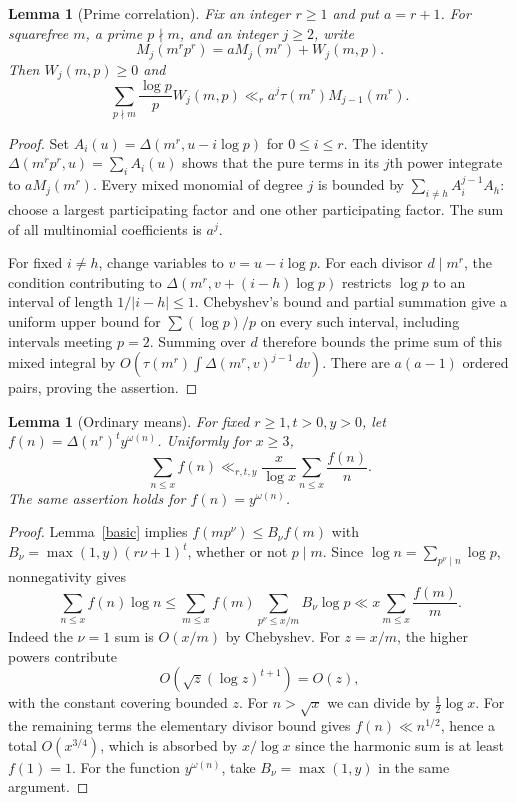 \documentclass[11pt,a4paper]{article}
\newtheorem{lemma}[theorem]{Lemma}
\newcommand{\Del}{\Delta}
\newcommand{\om}{\omega}
\begin{document}
\begin{lemma}[Prime correlation]\label{correlation}
Fix an integer $r\ge1$ and put $a=r+1$. For squarefree $m$, a prime
$p\nmid m$, and an integer $j\ge2$, write
\[
 M_j(m^rp^r)=aM_j(m^r)+W_j(m,p).
\]
Then $W_j(m,p)\ge0$ and
\[
 \sum_{p\nmid m}\frac{\log p}{p}W_j(m,p)
 \ll_r a^j\tau(m^r)M_{j-1}(m^r).
\]
\end{lemma}
\begin{proof}
Set $A_i(u)=\Del(m^r,u-i\log p)$ for $0\le i\le r$.
The identity $\Del(m^rp^r,u)=\sum_i A_i(u)$ shows that the pure
terms in its $j$th power integrate to $aM_j(m^r)$.
Every mixed monomial of degree $j$ is bounded by
$\sum_{i\ne h}A_i^{j-1}A_h$: choose a largest participating factor and
one other participating factor. The sum of all multinomial coefficients
is $a^j$.

For fixed $i\ne h$, change variables to $v=u-i\log p$.
For each divisor $d\mid m^r$, the condition contributing to
$\Del(m^r,v+(i-h)\log p)$ restricts $\log p$ to an interval of
length $1/|i-h|\le1$. Chebyshev's bound and partial summation give a
uniform upper bound for $\sum (\log p)/p$ on every such interval,
including intervals meeting $p=2$. Summing over $d$ therefore bounds
the prime sum of this mixed integral by
$O(\tau(m^r)\int\Del(m^r,v)^{j-1}\,dv)$.
There are $a(a-1)$ ordered pairs, proving the assertion.
\end{proof}

\begin{lemma}[Ordinary means]\label{means}
For fixed $r\ge1,t>0,y>0$, let
$f(n)=\Del(n^r)^t y^{\om(n)}$. Uniformly for $x\ge3$,
\[
 \sum_{n\le x}f(n)\ll_{r,t,y}
 \frac{x}{\log x}\sum_{n\le x}\frac{f(n)}n.
\]
The same assertion holds for $f(n)=y^{\om(n)}$.
\end{lemma}
\begin{proof}
Lemma~\ref{basic} implies
$f(mp^\nu)\le B_\nu f(m)$ with
$B_\nu=\max(1,y)(r\nu+1)^t$, whether or not $p\mid m$.
Since $\log n=\sum_{p^\nu\mid n}\log p$, nonnegativity gives
\[
 \sum_{n\le x}f(n)\log n
 \le\sum_{m\le x}f(m)
       \sum_{p^\nu\le x/m}B_\nu\log p
 \ll x\sum_{m\le x}\frac{f(m)}m.
\]
Indeed the $\nu=1$ sum is $O(x/m)$ by Chebyshev. For $z=x/m$, the
higher powers contribute
\[
 O(\sqrt z(\log z)^{t+1})=O(z),
\]
with the constant covering bounded $z$. For $n>\sqrt x$ we can divide by
$\tfrac12\log x$. For the remaining terms the elementary divisor
bound gives $f(n)\ll n^{1/2}$, hence a total $O(x^{3/4})$, which is
absorbed by $x/\log x$ since the harmonic sum is at least $f(1)=1$.
For the function $y^{\om(n)}$, take $B_\nu=\max(1,y)$ in the same argument.
\end{proof}
\end{document}
